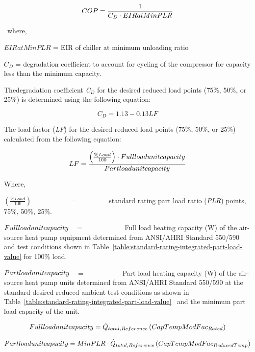 \begin{equation}
COP = \frac{{\rm{1}}}{{{C_D} \cdot EIRatMinPLR}}
\end{equation}

~where,

\(EIRatMinPLR\) = EIR of chiller at minimum unloading ratio

\({C_D}\) = degradation coefficient to account for cycling of the compressor for capacity less than the minimum capacity.

Thedegradation coefficient \emph{C\(_{D}\)} for the desired reduced load points (75\%, 50\%, or 25\%) is determined using the following equation:

\begin{equation}
{C_D} = 1.13 - 0.13LF
\end{equation}

The load factor (\emph{LF}) for the desired reduced load points (75\%, 50\%, or 25\%) calculated from the following equation:

\begin{equation}
LF = \frac{{\left( {\frac{{\% Load}}{{100}}} \right) \cdot Full{\rm{ }}load{\rm{ }}unit{\rm{ }}capacity}}{{Part{\rm{ }}load{\rm{ }}unit{\rm{ }}capacity}}
\end{equation}

Where,

\emph{\(\left( {\frac{{\% Load}}{{100}}} \right)\)}~~~~~~~~~~~ = ~~~~~~~~ standard rating part load ratio (\emph{PLR}) points, 75\%, 50\%, 25\%.

\(Full{\rm{ }}load{\rm{ }}unit{\rm{ }}capacity\) ~ = ~~~~~~~~~~~ Full load heating capacity (W) of the air-source heat pump equipment determined from ANSI/AHRI Standard 550/590 and test conditions shown in Table~\ref{table:standard-rating-integrated-part-load-value} for 100\% load.

\(Part{\rm{ }}load{\rm{ }}unit{\rm{ }}capacity\) ~ = ~~~~~~~~~~ Part load heating capacity (W) of the air-source heat pump units determined from ANSI/AHRI Standard 550/590 at the standard desired reduced ambient test conditions as shown in Table~\ref{table:standard-rating-integrated-part-load-value} ~and the minimum part load capacity of the unit.

\begin{equation}
Full{\rm{ }}load{\rm{ }}unit{\rm{ }}capacity = {\dot Q_{total,Reference}}\left( {CapTempModFa{c_{Rated}}} \right)
\end{equation}

\begin{equation}
Part{\rm{ }}load{\rm{ }}unit{\rm{ }}capacity = MinPLR \cdot {\dot Q_{total,Reference}}\left( {CapTempModFa{c_{ReducedTemp}}} \right)
\end{equation}

